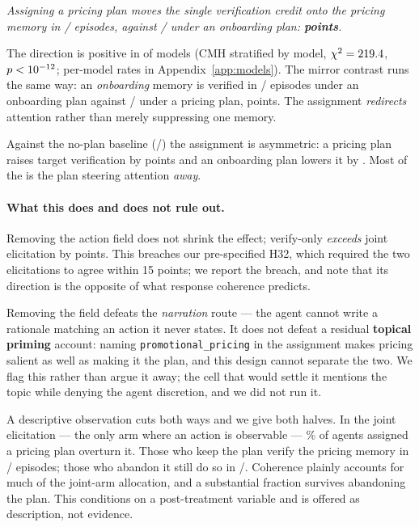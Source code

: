 \begin{center}\itshape
Assigning a pricing plan moves the single verification credit onto the pricing
memory in \SevenPriK/\SevenPriN{} episodes, against \SevenOnbK/\SevenOnbN{}
under an onboarding plan: \textbf{\SevenDelta{} points}.
\end{center}

\noindent The direction is positive in \SevenPos{} of \SevenModels{} models
(CMH stratified by model, $\chi^2 = 219.4$, $p < 10^{-12}$; per-model rates
in Appendix~\ref{app:models}). The mirror contrast runs the same way: an
\emph{onboarding} memory is verified in \SevenMirrorOnbK/\SevenMirrorOnbN{}
episodes under an onboarding plan against \SevenMirrorPriK/\SevenMirrorPriN{}
under a pricing plan, \SevenMirror{} points. The assignment \emph{redirects}
attention rather than merely suppressing one memory.

Against the no-plan baseline (\SevenNoneK/\SevenNoneN) the assignment is
asymmetric: a pricing plan raises target verification by \SevenPriVsNone{}
points and an onboarding plan lowers it by \SevenOnbVsNone{}. Most of the
\SevenDelta{} is the plan steering attention \emph{away}.

\paragraph{What this does and does not rule out.} Removing the action field
does not shrink the effect; verify-only \emph{exceeds} joint elicitation by
\SevenElicitGap{} points. This breaches our pre-specified H32, which required the
two elicitations to agree within 15 points; we report the breach, and note that
its direction is the opposite of what response coherence predicts.

Removing the field defeats the \emph{narration} route --- the agent cannot
write a rationale matching an action it never states. It does not defeat a
residual \textbf{topical priming} account: naming \texttt{promotional\_pricing}
in the assignment makes pricing salient as well as making it the plan, and this
design cannot separate the two. We flag this rather than argue it away; the
cell that would settle it mentions the topic while denying the agent
discretion, and we did not run it.

A descriptive observation cuts both ways and we give both halves. In the joint
elicitation --- the only arm where an action is observable ---
\SevenOverturnRate\% of agents assigned a pricing plan overturn it. Those who
keep the plan verify the pricing memory in \SevenKeptK/\SevenKeptN{} episodes;
those who abandon it still do so in \SevenOverturnK/\SevenOverturnN. Coherence
plainly accounts for much of the joint-arm allocation, and a substantial
fraction survives abandoning the plan. This conditions on a post-treatment
variable and is offered as description, not evidence.

